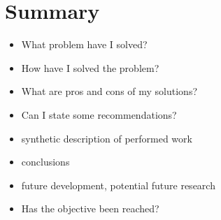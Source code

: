 \chapter{Summary}

\begin{itemize}
\item What problem have I solved?
\item How have I solved the problem?
\item What are pros and cons of my solutions?
\item Can I state some recommendations?
\end{itemize}

\begin{itemize}
\item synthetic description of performed work
\item conclusions
\item  future development, potential future research
\item Has the objective been reached?
\end{itemize}

